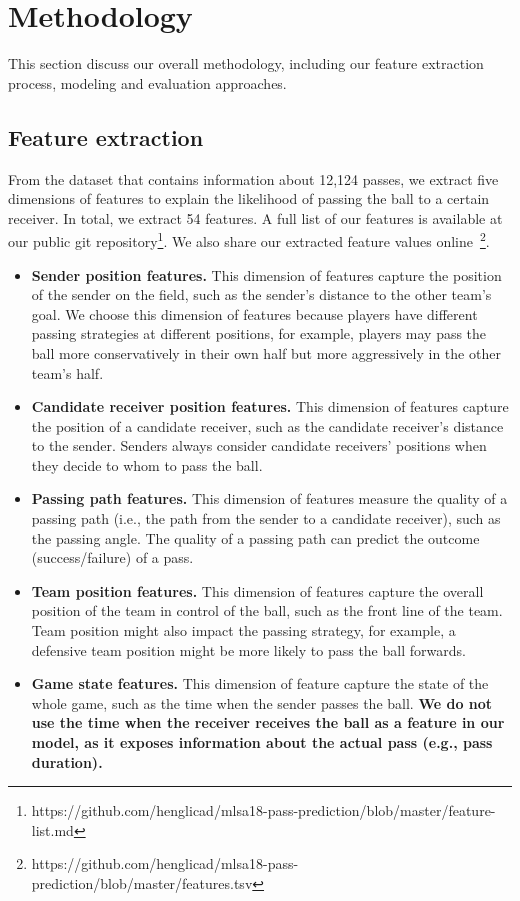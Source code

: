 \section{Methodology} \label{methodology}
This section discuss our overall methodology, including our feature extraction process, modeling and evaluation approaches.

\subsection{Feature extraction}

From the dataset that contains information about 12,124 passes\footnotemark[\ref{origin_dataset}], we extract five dimensions of features to explain the likelihood of passing the ball to a certain receiver. In total, we extract 54 features. A full list of our features is available at our public git repository\footnote{\label{feature-list}https://github.com/henglicad/mlsa18-pass-prediction/blob/master/feature-list.md}. 
We also share our extracted feature values online~\footnote{\label{feature-values}https://github.com/henglicad/mlsa18-pass-prediction/blob/master/features.tsv}.
\begin{itemize}
	\item \textbf{Sender position features.} This dimension of features capture the position of the sender on the field, such as the sender's distance to the other team's goal. We choose this dimension of features because players have different passing strategies at different positions, for example, players may pass the ball more conservatively in their own half but more aggressively in the other team's half.
	\item \textbf{Candidate receiver position features.} This dimension of features capture the position of a candidate receiver, such as the candidate receiver's distance to the sender. Senders always consider candidate receivers' positions when they decide to whom to pass the ball.
	\item \textbf{Passing path features.} This dimension of features measure the quality of a passing path (i.e., the path from the sender to a candidate receiver), such as the passing angle. The quality of a passing path can predict the outcome (success/failure) of a pass.
	\item \textbf{Team position features.} This dimension of features capture the overall position of the team in control of the ball, such as the front line of the team. Team position might also impact the passing strategy, for example, a defensive team position might be more likely to pass the ball forwards.
	\item \textbf{Game state features.} This dimension of feature capture the state of the whole game, such as the time when the sender passes the ball. \textbf{We do not use the time when the receiver receives the ball as a feature in our model, as it exposes information about the actual pass (e.g., pass duration).}
\end{itemize}

